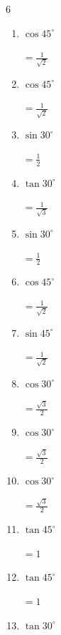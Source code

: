 \begin{multicols}{6}
\begin{enumerate}
        $\displaystyle =\frac{\sqrt{3}}{2}$

  \item $\displaystyle \cos{45^\circ}$

        $\displaystyle =\frac{1}{\sqrt{2}}$

  \item $\displaystyle \cos{45^\circ}$

        $\displaystyle =\frac{1}{\sqrt{2}}$

  \item $\displaystyle \sin{30^\circ}$

        $\displaystyle =\frac{1}{2}$

  \item $\displaystyle \tan{30^\circ}$

        $\displaystyle =\frac{1}{\sqrt{3}}$

  \item $\displaystyle \sin{30^\circ}$

        $\displaystyle =\frac{1}{2}$

  \item $\displaystyle \cos{45^\circ}$

        $\displaystyle =\frac{1}{\sqrt{2}}$

  \item $\displaystyle \sin{45^\circ}$

        $\displaystyle =\frac{1}{\sqrt{2}}$

  \item $\displaystyle \cos{30^\circ}$

        $\displaystyle =\frac{\sqrt{3}}{2}$

  \item $\displaystyle \cos{30^\circ}$

        $\displaystyle =\frac{\sqrt{3}}{2}$

  \item $\displaystyle \cos{30^\circ}$

        $\displaystyle =\frac{\sqrt{3}}{2}$

  \item $\displaystyle \tan{45^\circ}$

        $\displaystyle =1$

\columnbreak %

  \item $\displaystyle \tan{45^\circ}$

        $\displaystyle =1$

  \item $\displaystyle \tan{30^\circ}$


\end{enumerate}
\end{multicols}

